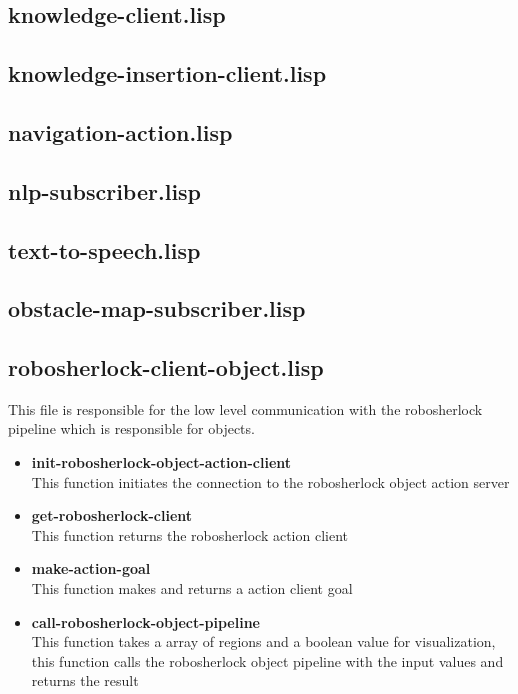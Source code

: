 \documentclass[main.tex]{subfiles}
\begin{document}
		\subsection{knowledge-client.lisp}
		\subsection{knowledge-insertion-client.lisp}
		\subsection{navigation-action.lisp}
		\subsection{nlp-subscriber.lisp}
		\subsection{text-to-speech.lisp}
		\subsection{obstacle-map-subscriber.lisp}
		\subsection{robosherlock-client-object.lisp}
		This file is responsible for the low level communication with the robosherlock pipeline which is responsible for objects.
		\begin{itemize}
			\item \textbf{init-robosherlock-object-action-client} \\
			This function initiates the connection to the robosherlock object action server
			\item \textbf{get-robosherlock-client} \\
			This function returns the robosherlock action client
			\item \textbf{make-action-goal} \\
			This function makes and returns a action client goal
			\item \textbf{call-robosherlock-object-pipeline} \\
			This function takes a array of regions and a boolean value for visualization, this function calls the robosherlock object pipeline with the input values and returns the result
		\end{itemize}
\end{document}
